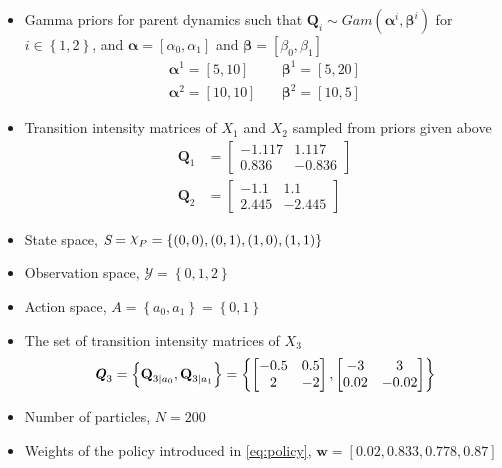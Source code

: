 \begin{itemize}
	\item Gamma priors for parent dynamics such that $ \textbf{Q}_{i} \sim Gam(\boldsymbol{\alpha}^i, \boldsymbol{\beta}^i)$ for $i \in \left\lbrace 1,2\right\rbrace $, and $ \boldsymbol{\alpha} = [\alpha_0, \alpha_1] $ and $ \boldsymbol{\beta} = [\beta_0, \beta_1] $
	\begin{align}
	\boldsymbol{\alpha}^1 = [5,10] &\quad \boldsymbol{\beta}^1 = [5,20] \\
	\boldsymbol{\alpha}^2 = [10,10] &\quad \boldsymbol{\beta}^2 = [10,5]
	\label{eq:gamma_params}
	\end{align}
	\item Transition intensity matrices of $ X_1 $ and $ X_2 $ sampled from priors given above
	\begin{align}
	\textbf{Q}_1 &= 
	\begin{bmatrix}
	-1.117 & 1.117 \\
	0.836 &  -0.836
	\end{bmatrix} \\
	\textbf{Q}_2 &= 
	\begin{bmatrix}
	-1.1 & 1.1 \\
	2.445 &  -2.445
	\end{bmatrix}
	\end{align}
	\item State space, $ \textit{S} = \rchi_{P} = \left\lbrace (0, 0), (0, 1), (1, 0),(1, 1)\right\rbrace $
	\item Observation space, $ \mathcal{Y} = \left\lbrace 0, 1, 2 \right\rbrace $
	\item Action space, $ \textit{A} = \left\lbrace a_{0}, a_{1} \right\rbrace = \left\lbrace 0, 1\right\rbrace $
	\item The set of transition intensity matrices of $ X_3 $
	\begin{align}
	\textbf{\textit{Q}}_3 = \left\lbrace \textbf{Q}_{3\mid a_{0}}, \textbf{Q}_{3\mid a_{1}} \right\rbrace = \left\lbrace 
	\begin{bmatrix}
	-0.5 & 0.5 \\
	2 &  -2
	\end{bmatrix}, 
	\begin{bmatrix}
	-3 & 3 \\
	0.02 &  -0.02
	\end{bmatrix} 
	\right\rbrace 
	\end{align}
	\item Number of particles, $ N = 200 $
	\item Weights of the policy introduced in \autoref{eq:policy}, $ \textbf{w} = [0.02, 0.833, 0.778, 0.87] $
\end{itemize}

